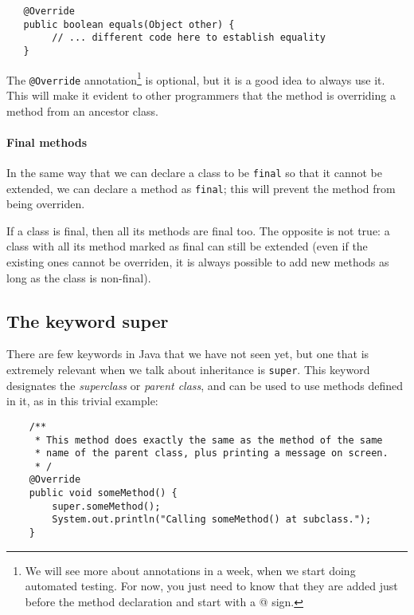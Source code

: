 \begin{verbatim}
   @Override
   public boolean equals(Object other) {
        // ... different code here to establish equality
   }
\end{verbatim}

The \verb+@Override+ annotation\footnote{We will see more about
  annotations in a week, when we start doing automated testing. For
  now, you just need to know that they are added just before the
  method declaration and start with a @ sign. } is optional, but it is a good idea to
always use it. This will make it evident to other programmers 
that the method is overriding a
method from an ancestor class. 


\paragraph{Final methods}
\label{sec:final-methods}

In the same way that we can declare a class to be \verb+final+ so that
it cannot be extended, we can declare a method as \verb+final+; this
will prevent the method from being overriden. 

If a class is final, then all its methods are final too. 
The opposite is not true: a class with all its method
marked as final can still be extended (even if the existing ones
cannot be overriden, it is always possible to add new methods as long
as the class is non-final).

\subsection{The keyword super}
\label{sec:keyword-super}

There are few keywords in Java that we have not seen yet, but one that
is extremely relevant when we talk about inheritance is
\verb+super+. This keyword designates the \emph{superclass} or
\emph{parent class}, and can be used to use methods defined in it, as
in this trivial example: 

\begin{verbatim}
    /**
     * This method does exactly the same as the method of the same
     * name of the parent class, plus printing a message on screen. 
     * /
    @Override
    public void someMethod() {
        super.someMethod();
        System.out.println("Calling someMethod() at subclass.");
    }
\end{verbatim}

